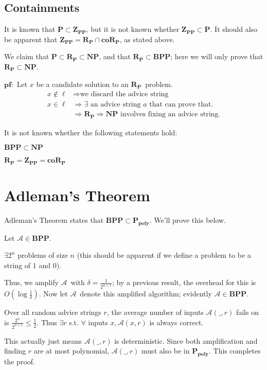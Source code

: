 \documentclass[11pt]{article}
\newcommand{\Pt}{\ensuremath{\mathbf{P}}}
\newcommand{\NP}{\ensuremath{\mathbf{NP}}}
\newcommand{\BPP}{\ensuremath{\mathbf{BPP}}}
\newcommand{\ZPP}{\ensuremath{\mathbf{Z_{PP}}}}
\newcommand{\RP}{\ensuremath{\mathbf{R_{P}}}}
\newcommand{\coRP}{\ensuremath{\mathbf{coR_{P}}}}
\newcommand{\Ppoly}{\ensuremath{\mathbf{P_{poly}}}}
\newcommand{\Alg}{\ensuremath{\mathcal{A}}}
\begin{document}
\subsection{Containments}

It is known that $\Pt\subset\ZPP$, but it is not known whether $\ZPP\subset\Pt$.
It should also be apparent that $\ZPP = \RP\cap\coRP$, as stated above.

We claim that $\Pt\subset\RP\subset\NP$, and that $\RP\subset\BPP$; here we will only prove that $\RP\subset\NP$.

$\mathbf{pf: }$
Let $x$ be a candidate solution to an \RP\ problem. 
\begin{align*}
  x\notin\ell &\Rightarrow \text{we discard the advice string}\\
  x\in\ell &\Rightarrow \exists\text{ an advice string $a$ that can prove that.}\\
  &\Rightarrow \RP \Rightarrow \NP \text{ involves fixing an advice string.} 
\end{align*}

It is not known whether the following statements hold:

$\BPP\subset\NP$

$\RP=\ZPP=\coRP$

\section{Adleman's Theorem}

Adleman's Theorem states that $\BPP\subset\Ppoly$. We'll prove this below.

Let $\Alg\in\BPP$.

$\exists 2^n$ problems of size $n$ (this should be apparent if we define a problem to be a string of $1$ and $0$).

Thus, we amplify \Alg\ with $\delta = \frac{1}{2^{n+1}}$; by a previous result, the overhead for this is $O(\log{\frac{1}{\delta}})$. Now let \Alg\ denote this amplified algorithm; evidently $\Alg\in\BPP$.

Over all random advice strings $r$, the average number of inputs $\Alg(\_, r)$ fails on is $\frac{2^n}{2^{n+1}} \leq \frac{1}{2}$. Thus $\exists r$ s.t. $\forall$ inputs $x, \Alg(x, r)$ is always correct.

This actually just means $\Alg(\_, r)$ is deterministic. Since both amplification and finding $r$ are at most polynomial, $\Alg(\_, r)$ must also be in \Ppoly. This completes the proof.




\begin{thebibliography}{42}


\end{thebibliography}
\end{document}
